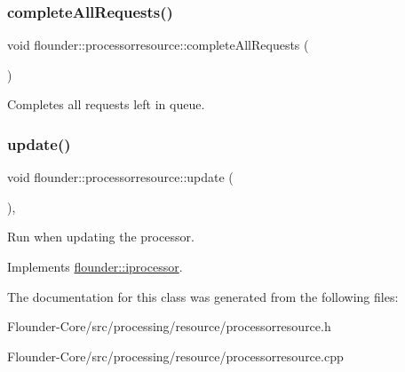 \subsubsection{\texorpdfstring{complete\+All\+Requests()}{completeAllRequests()}}
{\footnotesize\ttfamily void flounder\+::processorresource\+::complete\+All\+Requests (\begin{DoxyParamCaption}{ }\end{DoxyParamCaption})}



Completes all requests left in queue. 

\mbox{\label{classflounder_1_1processorresource_afaeb27a9673c1f9b4366b537b7c0d377}} 
\subsubsection{\texorpdfstring{update()}{update()}}
{\footnotesize\ttfamily void flounder\+::processorresource\+::update (\begin{DoxyParamCaption}{ }\end{DoxyParamCaption})\hspace{0.3cm}{\ttfamily [override]}, {\ttfamily [virtual]}}



Run when updating the processor. 



Implements \hyperlink{classflounder_1_1iprocessor_ad2edfece3465ec3dbe0a5feac26bdbc3}{flounder\+::iprocessor}.



The documentation for this class was generated from the following files\+:\begin{DoxyCompactItemize}
\item 
Flounder-\/\+Core/src/processing/resource/processorresource.\+h\item 
Flounder-\/\+Core/src/processing/resource/processorresource.\+cpp\end{DoxyCompactItemize}

